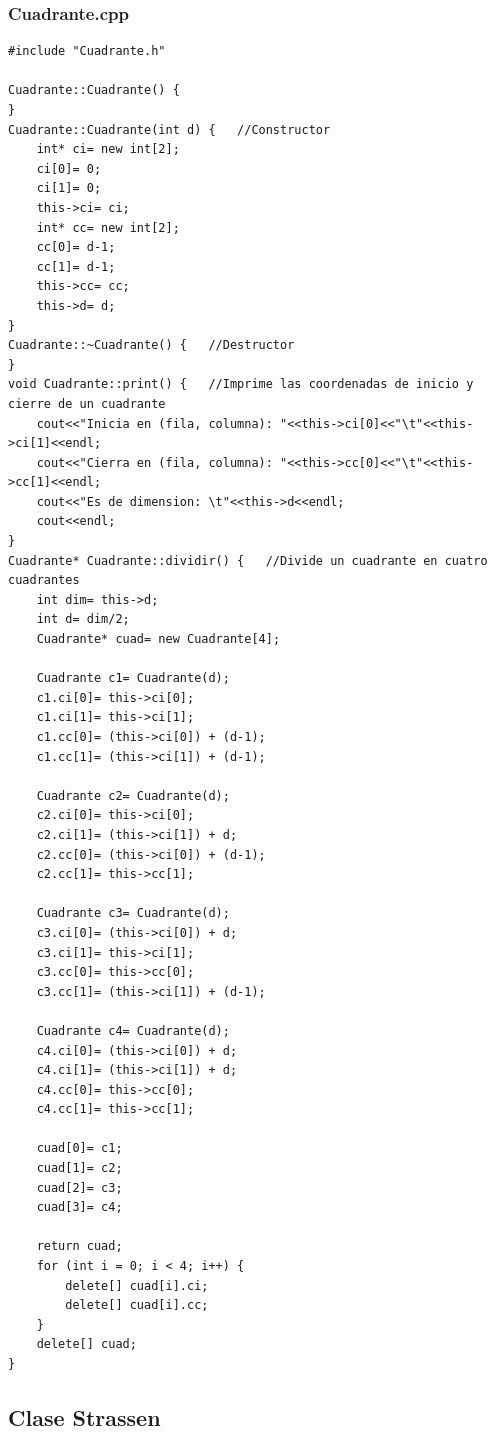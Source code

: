 \documentclass[12pt,letterpaper]{article}
\begin{document}
\subsubsection*{Cuadrante.cpp}
\begin{lstlisting}
#include "Cuadrante.h"

Cuadrante::Cuadrante() {
}
Cuadrante::Cuadrante(int d) {	//Constructor
	int* ci= new int[2];
	ci[0]= 0;
	ci[1]= 0; 
	this->ci= ci;
	int* cc= new int[2];
	cc[0]= d-1;
	cc[1]= d-1;
	this->cc= cc;
	this->d= d;
}
Cuadrante::~Cuadrante() {	//Destructor
}
void Cuadrante::print() {	//Imprime las coordenadas de inicio y cierre de un cuadrante
	cout<<"Inicia en (fila, columna): "<<this->ci[0]<<"\t"<<this->ci[1]<<endl;
	cout<<"Cierra en (fila, columna): "<<this->cc[0]<<"\t"<<this->cc[1]<<endl;
	cout<<"Es de dimension: \t"<<this->d<<endl;
	cout<<endl;
}
Cuadrante* Cuadrante::dividir() {	//Divide un cuadrante en cuatro cuadrantes
	int dim= this->d;
	int d= dim/2;
	Cuadrante* cuad= new Cuadrante[4];

	Cuadrante c1= Cuadrante(d);
	c1.ci[0]= this->ci[0];
	c1.ci[1]= this->ci[1];
	c1.cc[0]= (this->ci[0]) + (d-1);
	c1.cc[1]= (this->ci[1]) + (d-1);

	Cuadrante c2= Cuadrante(d);
	c2.ci[0]= this->ci[0];
	c2.ci[1]= (this->ci[1]) + d;
	c2.cc[0]= (this->ci[0]) + (d-1);
	c2.cc[1]= this->cc[1];

	Cuadrante c3= Cuadrante(d);
	c3.ci[0]= (this->ci[0]) + d;
	c3.ci[1]= this->ci[1];
	c3.cc[0]= this->cc[0];
	c3.cc[1]= (this->ci[1]) + (d-1);

	Cuadrante c4= Cuadrante(d);
	c4.ci[0]= (this->ci[0]) + d;
	c4.ci[1]= (this->ci[1]) + d;
	c4.cc[0]= this->cc[0];
	c4.cc[1]= this->cc[1];

	cuad[0]= c1;
	cuad[1]= c2;
	cuad[2]= c3;
	cuad[3]= c4;

	return cuad;
	for (int i = 0; i < 4; i++) {
		delete[] cuad[i].ci;
		delete[] cuad[i].cc;
	}
	delete[] cuad;
}
\end{lstlisting}
\newpage
\subsection{Clase Strassen}
\end{document}
